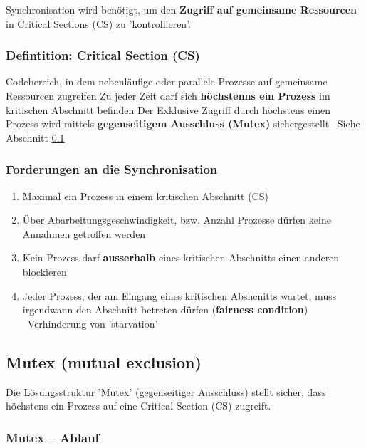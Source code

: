 Synchronisation wird benötigt, um den \textbf{Zugriff auf gemeinsame Ressourcen} in Critical Sections (CS) zu 'kontrollieren'.


\subsubsection{Defintition: Critical Section (CS)}

\begin{outline}
    \1 Codebereich, in dem nebenläufige oder parallele Prozesse auf gemeinsame Ressourcen zugreifen
        \2 Zu jeder Zeit darf sich \textbf{höchstenns ein Prozess} im kritischen Abschnitt befinden
    \1 Der Exklusive Zugriff durch höchstens einen Prozess wird mittels \textbf{gegenseitigem Ausschluss (Mutex)} sichergestellt
        \textrightarrow\ Siehe Abschnitt \ref{Mutex (mutual exclusion)}
\end{outline}


\subsubsection{Forderungen an die Synchronisation}

\begin{enumerate}
    \item Maximal ein Prozess in einem kritischen Abschnitt (CS)
    \item Über Abarbeitungsgeschwindigkeit, bzw. Anzahl Prozesse dürfen keine Annahmen getroffen werden
    \item Kein Prozess darf \textbf{ausserhalb} eines kritischen Abschnitts einen anderen blockieren
    \item Jeder Prozess, der am Eingang eines kritischen Abshcnitts wartet, muss irgendwann den Abschnitt betreten dürfen 
        (\textbf{fairness condition}) \textrightarrow\ Verhinderung von 'starvation'
\end{enumerate}


\subsection{Mutex (mutual exclusion)}
\label{Mutex (mutual exclusion)}

Die Lösungsstruktur 'Mutex' (gegenseitiger Ausschluss) stellt sicher, dass höchstens ein Prozess auf eine Critical Section (CS) zugreift. 


\subsubsection{Mutex -- Ablauf}

